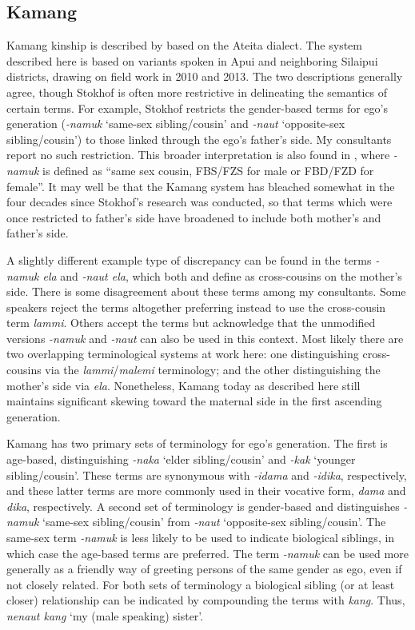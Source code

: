 \subsection{Kamang}\label{sect_kamang}
Kamang kinship is described by \citet{Stokhof1977} based on the Ateita dialect. The system described here is based on variants spoken in Apui and neighboring Silaipui districts, drawing on field work in 2010 and 2013. The two descriptions generally agree, though Stokhof is often more restrictive in delineating the semantics of certain terms. For example, Stokhof restricts the gender-based terms for ego's generation (\textit{-namuk} `same-sex sibling/cousin' and \textit{-naut} `opposite-sex sibling/cousin') to those linked through the ego's father's side. My consultants report no such restriction. This broader interpretation is also found in \citet{SchapperEtAl2011}, where \textit{-namuk} is defined as ``same sex cousin, FBS/FZS for male or FBD/FZD for female''. It may well be that the Kamang system has bleached somewhat in the four decades since Stokhof's research was conducted, so that terms which were once restricted to father's side have broadened to include both mother's and father's side.

A slightly different example type of discrepancy can be found in the terms \textit{-namuk ela} and \textit{-naut ela}, which both \citet{Stokhof1977} and   \citet{SchapperEtAl2011} define as cross-cousins on the mother's side. There is some disagreement about these terms among my consultants. Some speakers reject the terms altogether preferring instead to use the cross-cousin term \textit{lammi}. Others accept the terms but acknowledge that the unmodified versions \textit{-namuk} and \textit{-naut} can also be used in this context. Most likely there are two overlapping terminological systems at work here: one distinguishing cross-cousins via the \textit{lammi}/\textit{malemi} terminology; and the other distinguishing the mother's side via \textit{ela}. Nonetheless, Kamang today as described here still maintains significant skewing toward the maternal side in the first ascending generation. 

Kamang has two primary sets of terminology for ego's generation. The first is age-based, distinguishing \textit{-naka} `elder sibling/cousin' and \textit{-kak} `younger sibling/cousin'. These terms are synonymous with \textit{-idama} and \textit{-idika}, respectively, and these latter terms are more commonly used in their vocative form, \textit{dama} and \textit{dika}, respectively. A second set of terminology is gender-based and distinguishes \textit{-namuk} `same-sex sibling/cousin' from \textit{-naut} `opposite-sex sibling/cousin'. The same-sex term \textit{-namuk} is less likely to be used to indicate biological siblings, in which case the age-based terms are preferred. The term \textit{-namuk} can be used more generally as a friendly way of greeting persons of the same gender as ego, even if not closely related. For both sets of terminology a biological sibling (or at least closer) relationship can be indicated by compounding the terms with \textit{kang}. Thus, \textit{nenaut kang} `my (male speaking) sister'. 



